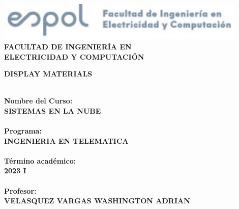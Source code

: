 
\begin{titlepage}
 
\includegraphics[width=0.9\textwidth]{images/espol.jpg}
\hspace{8cm}
\\[2.0em]
\noindent
{\fontsize{20}{0}\selectfont \textbf{\centering FACULTAD DE INGENIER\'IA EN \\ ELECTRICIDAD Y COMPUTACI\'ON}}\\[1.0em]
\begin{snugshade*}
\centering
\noindent\textsc{\fontsize{32}{20}\selectfont \textbf{DISPLAY MATERIALS}}\\[4.5em]
\end{snugshade*}

\noindent
\\[2.0em]
{\fontsize{16}{20}\selectfont \textbf{Nombre del Curso:}}\\[1.0em] 
{\fontsize{18}{20}\selectfont \textbf{SISTEMAS EN LA NUBE}}\\

\noindent
\\[.5em]
{\fontsize{16}{20}\selectfont \textbf{Programa:}}\\[1.0em] 
{\fontsize{18}{20}\selectfont \textbf{INGENIERIA EN TELEMATICA}}\\

\noindent
\\[.5em]
{\fontsize{16}{20}\selectfont \textbf{Término académico:}}\\[1.0em] 
{\fontsize{18}{20}\selectfont \textbf{2023 I}}\\

\noindent
\\[1.0em]
{\fontsize{16}{20}\selectfont \textbf{Profesor:}}\\[1.0em] 
{\fontsize{18}{20}\selectfont \textbf{VELASQUEZ VARGAS WASHINGTON ADRIAN}}\\

\end{titlepage}
\clearpage
\newpage